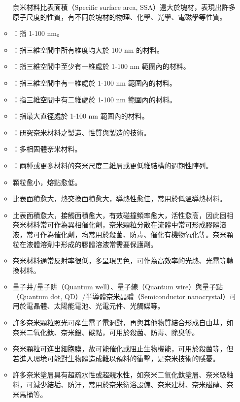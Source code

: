 \documentclass[a4paper,12pt]{report}
\begin{document}
\begin{itemize}
\begin{itemize}
奈米材料比表面積（Specific surface area, SSA）遠大於塊材，表現出許多原子尺度的性質，有不同於塊材的物理、化學、光學、電磁學等性質。
\bit
\item {}：指 1-100 nm。
\item {}：指三維空間中所有維度均大於 100 nm 的材料。
\item {}：指三維空間中至少有一維處於 1-100 nm 範圍內的材料。
\item {}：指三維空間中有一維處於 1-100 nm 範圍內的材料。
\item {}：指三維空間中有二維處於 1-100 nm 範圍內的材料。
\item {}：指最大直徑處於 1-100 nm 範圍內的材料。
\item {}：研究奈米材料之製造、性質與製造的技術。 
\item {}：多相固體奈米材料。
\item {}：兩種或更多材料的奈米尺度二維層或更低維結構的週期性陣列。
\eit
{}
\bit
\item 顆粒愈小，熔點愈低。
\item 比表面積愈大，熱交換面積愈大，導熱性愈佳，常用於低溫導熱材料。
\item 比表面積愈大，接觸面積愈大，有效碰撞頻率愈大，活性愈高，因此固相奈米材料常可作為異相催化劑，奈米顆粒分散在流體中常可形成膠體溶液，常可作為催化劑，均常用於殺菌、防毒、催化有機物氧化等。奈米顆粒在液體溶劑中形成的膠體溶液常需要保護劑。
\item 奈米材料通常反射率很低，多呈現黑色，可作為高效率的光熱、光電等轉換材料。
\item 量子井/量子阱（Quantum well）、量子線（Quantum wire）與量子點（Quantum dot, QD）/半導體奈米晶體（Semiconductor nanocrystal）可用於電晶體、太陽能電池、光電元件、光觸媒等。
\item 許多奈米顆粒照光可產生電子電洞對，再與其他物質結合形成自由基，如奈米二氧化鈦、奈米銀、碳點，可用於殺菌、防毒、除臭等。
\item 奈米顆粒可進出細胞膜，故可能催化或阻止生物機能，可用於殺菌等，但若進入環境可能對生物體造成難以預料的衝擊，是奈米技術的隱憂。
\item 許多奈米塗層具有超疏水性或超親水性，如奈米二氧化鈦塗層、奈米級釉料，可減少結垢、防汙，常用於奈米衛浴設備、奈米建材、奈米磁磚、奈米馬桶等。
\eit
{}

\end{itemize}
\end{itemize}
\end{document}

